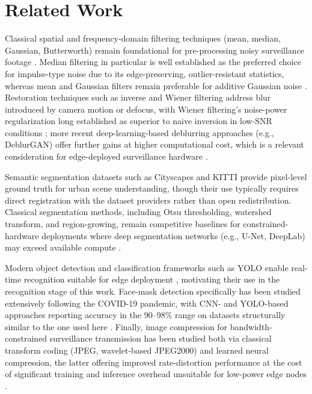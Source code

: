 \documentclass[conference]{IEEEtran}
\begin{document}
\section{Related Work}
Classical spatial and frequency-domain filtering techniques (mean, median, Gaussian, Butterworth) remain foundational for pre-processing noisy surveillance footage \cite{b1}. Median filtering in particular is well established as the preferred choice for impulse-type noise due to its edge-preserving, outlier-resistant statistics, whereas mean and Gaussian filters remain preferable for additive Gaussian noise \cite{b6}. Restoration techniques such as inverse and Wiener filtering address blur introduced by camera motion or defocus, with Wiener filtering's noise-power regularization long established as superior to naive inversion in low-SNR conditions \cite{b1}; more recent deep-learning-based deblurring approaches (e.g., DeblurGAN) offer further gains at higher computational cost, which is a relevant consideration for edge-deployed surveillance hardware \cite{b7}.

Semantic segmentation datasets such as Cityscapes \cite{b2} and KITTI \cite{b3} provide pixel-level ground truth for urban scene understanding, though their use typically requires direct registration with the dataset providers rather than open redistribution. Classical segmentation methods, including Otsu thresholding, watershed transform, and region-growing, remain competitive baselines for constrained-hardware deployments where deep segmentation networks (e.g., U-Net, DeepLab) may exceed available compute \cite{b8}.

Modern object detection and classification frameworks such as YOLO enable real-time recognition suitable for edge deployment \cite{b5}, motivating their use in the recognition stage of this work. Face-mask detection specifically has been studied extensively following the COVID-19 pandemic, with CNN- and YOLO-based approaches reporting accuracy in the 90--98\% range on datasets structurally similar to the one used here \cite{b9}. Finally, image compression for bandwidth-constrained surveillance transmission has been studied both via classical transform coding (JPEG, wavelet-based JPEG2000) \cite{b10} and learned neural compression, the latter offering improved rate-distortion performance at the cost of significant training and inference overhead unsuitable for low-power edge nodes \cite{b11}.
\end{document}
